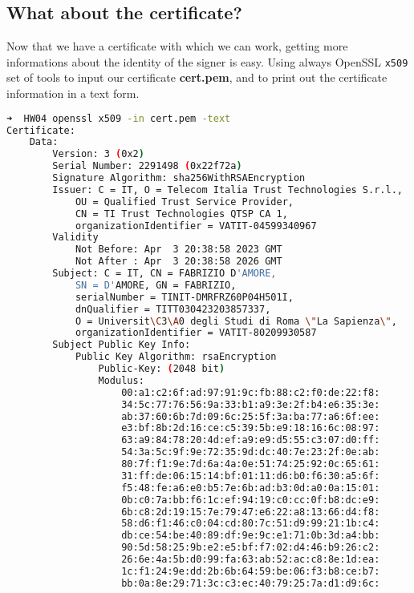 \documentclass{article}
\begin{document}
\subsection{What about the certificate?}
Now that we have a certificate with which we can work, getting more informations about the identity of the signer is easy.
Using always OpenSSL \texttt{x509} set of tools to input our certificate \textbf{cert.pem}, and to print out the certificate information in a text form.
\begin{lstlisting}[language=bash]
➜  HW04 openssl x509 -in cert.pem -text
Certificate:
    Data:
        Version: 3 (0x2)
        Serial Number: 2291498 (0x22f72a)
        Signature Algorithm: sha256WithRSAEncryption
        Issuer: C = IT, O = Telecom Italia Trust Technologies S.r.l., 
            OU = Qualified Trust Service Provider, 
            CN = TI Trust Technologies QTSP CA 1, 
            organizationIdentifier = VATIT-04599340967
        Validity
            Not Before: Apr  3 20:38:58 2023 GMT
            Not After : Apr  3 20:38:58 2026 GMT
        Subject: C = IT, CN = FABRIZIO D'AMORE, 
            SN = D'AMORE, GN = FABRIZIO, 
            serialNumber = TINIT-DMRFRZ60P04H501I, 
            dnQualifier = TITT030423203857337, 
            O = Universit\C3\A0 degli Studi di Roma \"La Sapienza\", 
            organizationIdentifier = VATIT-80209930587
        Subject Public Key Info:
            Public Key Algorithm: rsaEncryption
                Public-Key: (2048 bit)
                Modulus:
                    00:a1:c2:6f:ad:97:91:9c:fb:88:c2:f0:de:22:f8:
                    34:5c:77:76:56:9a:33:b1:a9:3e:2f:b4:e6:35:3e:
                    ab:37:60:6b:7d:09:6c:25:5f:3a:ba:77:a6:6f:ee:
                    e3:bf:8b:2d:16:ce:c5:39:5b:e9:18:16:6c:08:97:
                    63:a9:84:78:20:4d:ef:a9:e9:d5:55:c3:07:d0:ff:
                    54:3a:5c:9f:9e:72:35:9d:dc:40:7e:23:2f:0e:ab:
                    80:7f:f1:9e:7d:6a:4a:0e:51:74:25:92:0c:65:61:
                    31:ff:de:06:15:14:bf:01:11:d6:b0:f6:30:a5:6f:
                    f5:48:fe:a6:e0:b5:7e:6b:ad:b3:0d:a0:0a:15:01:
                    0b:c0:7a:bb:f6:1c:ef:94:19:c0:cc:0f:b8:dc:e9:
                    6b:c8:2d:19:15:7e:79:47:e6:22:a8:13:66:d4:f8:
                    58:d6:f1:46:c0:04:cd:80:7c:51:d9:99:21:1b:c4:
                    db:ce:54:be:40:89:df:9e:9c:e1:71:0b:3d:a4:bb:
                    90:5d:58:25:9b:e2:e5:bf:f7:02:d4:46:b9:26:c2:
                    26:6e:4a:5b:d0:99:fa:63:ab:52:ac:c8:8e:1d:ea:
                    1c:f1:24:9e:dd:2b:6b:64:59:be:06:f3:b8:ce:b7:
                    bb:0a:8e:29:71:3c:c3:ec:40:79:25:7a:d1:d9:6c:

\end{lstlisting}
\end{document}
